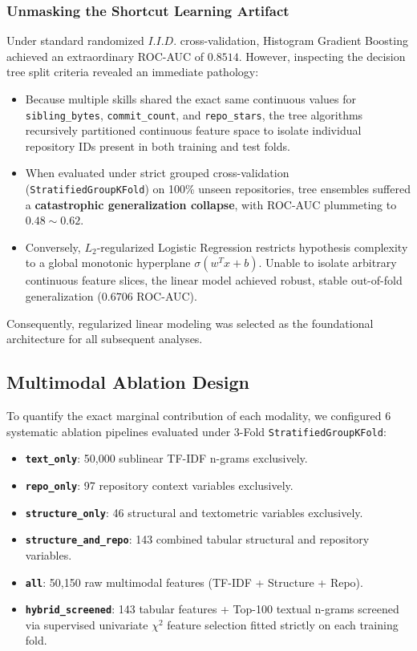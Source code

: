 \documentclass[12pt]{article}
\begin{document}
\subsubsection{Unmasking the Shortcut Learning Artifact}
Under standard randomized $I.I.D.$ cross-validation, Histogram Gradient Boosting achieved an extraordinary ROC-AUC of $\mathbf{0.8514}$. However, inspecting the decision tree split criteria revealed an immediate pathology:
\begin{itemize}
    \item Because multiple skills shared the exact same continuous values for \texttt{sibling\_bytes}, \texttt{commit\_count}, and \texttt{repo\_stars}, the tree algorithms recursively partitioned continuous feature space to isolate individual repository IDs present in both training and test folds.
    \item When evaluated under strict grouped cross-validation (\texttt{StratifiedGroupKFold}) on 100\% unseen repositories, tree ensembles suffered a \textbf{catastrophic generalization collapse}, with ROC-AUC plummeting to $\mathbf{0.48 \sim 0.62}$.
    \item Conversely, $L_2$-regularized Logistic Regression restricts hypothesis complexity to a global monotonic hyperplane $\sigma(w^T x + b)$. Unable to isolate arbitrary continuous feature slices, the linear model achieved robust, stable out-of-fold generalization ($0.6706$ ROC-AUC).
\end{itemize}
Consequently, regularized linear modeling was selected as the foundational architecture for all subsequent analyses.

\subsection{Multimodal Ablation Design}
To quantify the exact marginal contribution of each modality, we configured 6 systematic ablation pipelines evaluated under 3-Fold \texttt{StratifiedGroupKFold}:
\begin{itemize}
    \item \textbf{\texttt{text\_only}}: 50,000 sublinear TF-IDF n-grams exclusively.
    \item \textbf{\texttt{repo\_only}}: 97 repository context variables exclusively.
    \item \textbf{\texttt{structure\_only}}: 46 structural and textometric variables exclusively.
    \item \textbf{\texttt{structure\_and\_repo}}: 143 combined tabular structural and repository variables.
    \item \textbf{\texttt{all}}: 50,150 raw multimodal features (TF-IDF + Structure + Repo).
    \item \textbf{\texttt{hybrid\_screened}}: 143 tabular features + Top-100 textual n-grams screened via supervised univariate $\chi^2$ feature selection fitted strictly on each training fold.
\end{itemize}
\end{document}
